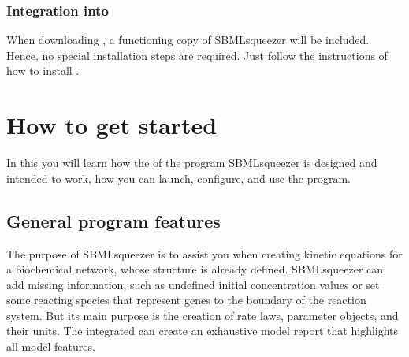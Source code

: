 \subsection{Integration into \Garuda}
\label{sec:GarudaInstall}

When downloading \Garuda, a functioning copy of SBMLsqueezer will be included.
Hence, no special installation steps are required. Just follow the instructions
of how to install \Garuda.



\chapter{How to get started}
\label{chap:GUI}

In this  you will learn how the \GUI of the program
SBMLsqueezer is designed and intended to work, how you can launch, configure,
and use the program. 

\section{General program features}

The purpose of SBMLsqueezer is to assist you when creating kinetic equations for
a biochemical network, whose structure is already defined.
SBMLsqueezer can add missing information, such as undefined initial concentration values
or set some reacting species that represent genes to the boundary of the reaction system.
But its main purpose is the creation of rate laws, parameter objects, and their units.
The integrated \SBMLLaTeX can create an exhaustive model report that highlights all
model features.

